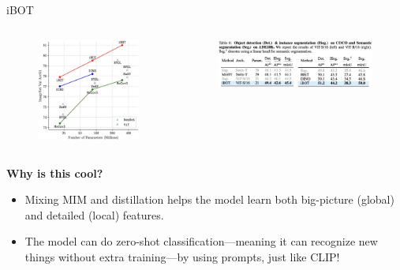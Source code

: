 \begin{frame}[allowframebreaks]{iBOT}
\begin{columns}[b]
        \begin{figure}
            \centering
            \includegraphics[width=\linewidth,height=0.9\textheight,keepaspectratio]{images/contrastive/slide_92_2_img.png}
        \end{figure}
        \begin{figure}
            \centering
            \includegraphics[width=\linewidth,height=0.9\textheight,keepaspectratio]{images/contrastive/slide_92_1_img.png}
        \end{figure}
\end{columns}

\framebreak

\textbf{Why is this cool?}
\begin{itemize}
    \item Mixing MIM and distillation helps the model learn both big-picture (global) and detailed (local) features.
    \item The model can do zero-shot classification—meaning it can recognize new things without extra training—by using prompts, just like CLIP!
\end{itemize}
\end{frame}